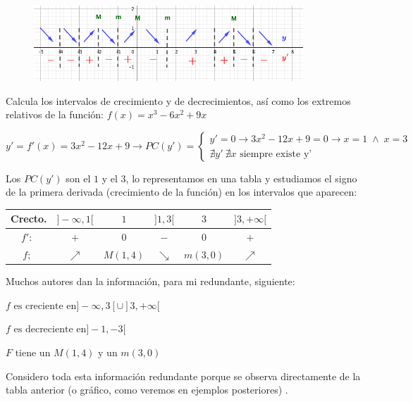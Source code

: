 	
	\begin{figure}[H]
		\centering
		\includegraphics[width=0.9\textwidth]{imagenes/imagenes05/T05IM07.png}
	\end{figure}
	
	\begin{ejem} Calcula los intervalos de crecimiento y de decrecimientos, así como los extremos relativos de la función:  $f(x)=x^3-6x^2+9x$
	
	\noindent \small{$y'=f'(x)=3x^2-12 x+9 \to PC(y') =\begin{cases}
	y'=0 \to 3x^2-12x+9=0 \to x=1 \; \wedge \; x=3 \\
	\nexists y' \ \nexists x \mbox{ siempre existe y'}
	\end{cases}$}
	
	\normalsize{Los} $PC(y')$ son el $1$ y el $3$, lo representamos en una tabla y estudiamos el signo de la primera derivada (crecimiento de la función) en los intervalos que aparecen:
	
	\begin{table}[H]
	\centering
	\begin{tabular}{|c|c|c|c|c|c|}
	\hline
	Crecto. &$]-\infty,1[$  & $1$ & $]1,3[$ & $3$ & $]3,+\infty[$ \\ \hline
 	$f':\; $ &  $+$ & $0$ & $-$ & $0$ & $+$ \\ \hline
 	$f;\;$ & $\nearrow$  & $M(1,4)$ & $\searrow$ & $m(3,0)$ & $\nearrow$ \\ \hline
	\end{tabular}
	\end{table}
	
	Muchos autores dan la información, para mi redundante, siguiente:
	
	\hspace{10mm} $f \mbox{ es creciente en} ]-\infty,3[\cup ]3,+\infty[$
	
	\hspace{10mm} $f \mbox{ es decreciente en} ]-1,-3[$
	
	\hspace{10mm}  $F \mbox{ tiene un } M(1,4) \mbox{ y un } m(3,0)$
	
	Considero toda esta información redundante porque se observa directamente de la tabla anterior (o gráfico, como veremos en ejemplos posteriores) .
	
		
	\end{ejem}
	
